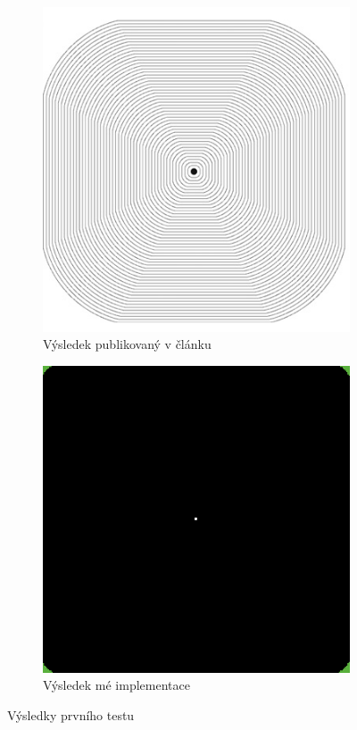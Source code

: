 \documentclass[11pt,a4paper]{scrartcl}
\begin{document}
	\begin{figure}[H]
		\centering
		\begin{subfigure} {0.3 \textwidth}
			\includegraphics[width=\linewidth]{art-homogeneous-no-wh}
			\caption{Výsledek publikovaný v článku}
			\label{fig:test-1-res-art}
		\end{subfigure}
		\hspace*{0.1 \textwidth}
		\begin{subfigure} {0.3 \textwidth}
			\includegraphics[width=\linewidth]{homogeneous-no-wh}
			\caption{Výsledek mé implementace}
			\label{fig:test-1-res-mine}
		\end{subfigure}
	
		\caption{Výsledky prvního testu}
		\label{fig:test-1-res}
	\end{figure}
	
\end{document}

